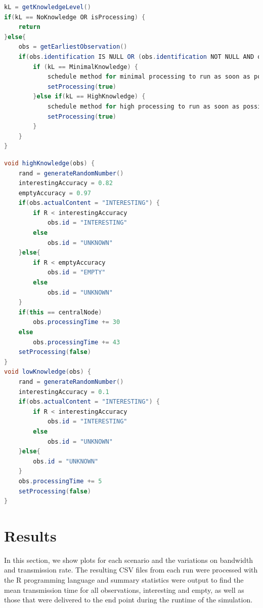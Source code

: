 \begin{lstlisting}[breaklines=true, caption={Processing Function for DA and DP Nodes}, label={alg:sim:proc}, language=java]
kL = getKnowledgeLevel()
if(kL == NoKnowledge OR isProcessing) {
	return
}else{
	obs = getEarliestObservation()
	if(obs.identification IS NULL OR (obs.identification NOT NULL AND obs.identifiedBy.getKnowledgeLevel() < kL)) {
		if (kL == MinimalKnowledge) {
			schedule method for minimal processing to run as soon as possible for 5 ticks
			setProcessing(true)
		}else if(kL == HighKnowledge) {
			schedule method for high processing to run as soon as possible for 43 ticks
			setProcessing(true)
		}
	}
}
\end{lstlisting}
\vfill
\begin{lstlisting}[breaklines=true, caption={Processing Functions for Nodes}, label={alg:sim:know}, language=java]
void highKnowledge(obs) {
	rand = generateRandomNumber()
	interestingAccuracy = 0.82
	emptyAccuracy = 0.97
	if(obs.actualContent = "INTERESTING") {
		if R < interestingAccuracy
			obs.id = "INTERESTING"
		else
			obs.id = "UNKNOWN"
	}else{
		if R < emptyAccuracy
			obs.id = "EMPTY"
		else
			obs.id = "UNKNOWN"
	}
	if(this == centralNode)
		obs.processingTime += 30
	else
		obs.processingTime += 43
	setProcessing(false)
}
void lowKnowledge(obs) {
	rand = generateRandomNumber()
	interestingAccuracy = 0.1
	if(obs.actualContent = "INTERESTING") {
		if R < interestingAccuracy
			obs.id = "INTERESTING"
		else
			obs.id = "UNKNOWN"
	}else{
		obs.id = "UNKNOWN"
	}
	obs.processingTime += 5
	setProcessing(false)
}

\end{lstlisting}

\section{Results}\label{sim:res}
In this section, we show plots for each scenario and the variations on bandwidth and transmission rate. The resulting CSV files from each run were processed with the R programming language \cite{rlang} and summary statistics were output to find the mean transmission time for all observations, interesting and empty, as well as those that were delivered to the end point during the runtime of the simulation.


